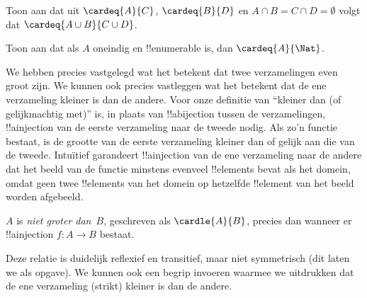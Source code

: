 \documentclass[openany]{memoir}
\begin{document}
\begin{prob}
Toon aan dat uit $\cardeq{A}{C}$, $\cardeq{B}{D}$ en $A \cap B =
C \cap D = \emptyset$ volgt dat $\cardeq{A \cup B}{C \cup D}$.
\end{prob}

\begin{prob}
Toon aan dat als $A$ oneindig en !!{enumerable} is, dan
$\cardeq{A}{\Nat}$.
\end{prob}
\endgroup

\begingroup
\def\olfilename{OLP-0036}
\def\olfilepath{content/sets-functions-relations/size-of-sets/}
\hypertarget{unit-OLP-0036}{}





\begin{explain}
We hebben precies vastgelegd wat het betekent dat twee verzamelingen
even groot zijn. We kunnen ook precies vastleggen wat het betekent dat de
ene verzameling kleiner is dan de andere. Voor onze definitie van ``kleiner
dan (of gelijkmachtig met)'' is, in plaats van !!a{bijection} tussen de
verzamelingen, !!a{injection} van de eerste verzameling naar de tweede nodig.
Als zo'n functie bestaat, is de grootte van de eerste verzameling kleiner
dan of gelijk aan die van de tweede. Intuïtief garandeert !!a{injection} van
de ene verzameling naar de andere dat het beeld van de functie minstens
evenveel !!{element}s bevat als het domein, omdat geen twee !!{element}s van
het domein op hetzelfde !!{element} van het beeld worden afgebeeld.
\end{explain}

\begin{defn}
$A$ is \emph{niet groter dan}~$B$, geschreven als $\cardle{A}{B}$, precies
dan wanneer er !!a{injection} $f \colon A \to B$ bestaat.
\end{defn}

Deze relatie is duidelijk reflexief en transitief, maar niet symmetrisch
(dit laten we als opgave). We kunnen ook een begrip invoeren waarmee we
uitdrukken dat de ene verzameling (strikt) kleiner is dan de andere. 
\end{document}
